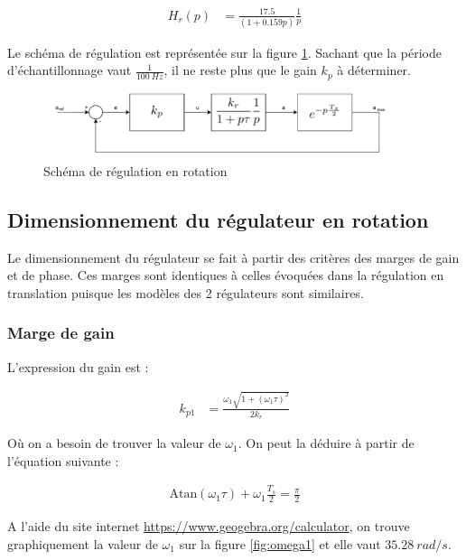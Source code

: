 \begin{align*}
H_r(p)&=\frac{17.5}{(1+0.159p )} \frac{1}{p}
\end{align*}

Le schéma de régulation est représentée sur la figure \ref{fig:schémaregrot}. Sachant que la période d'échantillonnage vaut $\frac{1}{100 \ Hz}$, il ne reste plus que le gain $k_p$ à déterminer.

\begin{figure}[H]
    \centering
    \includegraphics[width=0.9\textwidth]{pdffiles/regrot.drawio.pdf}
    \caption{Schéma de régulation en rotation}
    \label{fig:schémaregrot}
\end{figure}

\subsection{Dimensionnement du régulateur en rotation}

Le dimensionnement du régulateur se fait à partir des critères des marges de gain et de phase. Ces marges sont identiques à celles évoquées dans la régulation en translation puisque les modèles des 2 régulateurs sont similaires.

\subsubsection{Marge de gain}

L'expression du gain est : 

\begin{align*}
    k_{p1} &= \frac{\omega_1 \sqrt{1 +(\omega_1 \tau)^2 }}{2 k_r}
\end{align*}

Où on a besoin de trouver la valeur de $\omega_1$. On peut la déduire à partir de l'équation suivante :

\begin{align*}
    \text{Atan}(\omega_1 \tau)+ \omega_1 \frac{T_s }{2}=\frac{\pi}{2} 
\end{align*}

A l'aide du site internet \url{https://www.geogebra.org/calculator}, on trouve graphiquement la valeur de $\omega_1$ sur la figure \ref{fig:omega1} et elle vaut $35.28 \ rad/s$.

